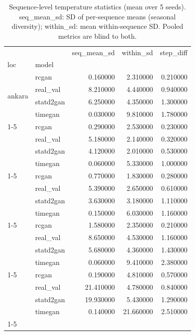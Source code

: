 \begin{table}
\caption{Sequence-level temperature statistics (mean over 5 seeds). seq\_mean\_sd: SD of per-sequence means (seasonal diversity); within\_sd: mean within-sequence SD. Pooled metrics are blind to both.}
\label{tab:seq_level}
\begin{tabular}{llrrr}
\toprule
 &  & seq\_mean\_sd & within\_sd & step\_diff \\
loc & model &  &  &  \\
\midrule
\multirow[t]{4}{*}{ankara} & rcgan & 0.160000 & 2.310000 & 0.210000 \\
 & real\_val & 8.210000 & 4.440000 & 0.940000 \\
 & statd2gan & 6.250000 & 4.350000 & 1.300000 \\
 & timegan & 0.030000 & 9.810000 & 1.780000 \\
\cline{1-5}
\multirow[t]{4}{*}{bergen} & rcgan & 0.290000 & 2.530000 & 0.230000 \\
 & real\_val & 5.180000 & 2.140000 & 0.320000 \\
 & statd2gan & 4.120000 & 2.010000 & 0.530000 \\
 & timegan & 0.060000 & 5.330000 & 1.000000 \\
\cline{1-5}
\multirow[t]{4}{*}{dubai} & rcgan & 0.770000 & 1.830000 & 0.280000 \\
 & real\_val & 5.390000 & 2.650000 & 0.610000 \\
 & statd2gan & 3.630000 & 3.180000 & 1.110000 \\
 & timegan & 0.150000 & 6.030000 & 1.160000 \\
\cline{1-5}
\multirow[t]{4}{*}{lhasa} & rcgan & 1.580000 & 2.350000 & 0.210000 \\
 & real\_val & 8.650000 & 4.530000 & 1.160000 \\
 & statd2gan & 5.680000 & 4.360000 & 1.430000 \\
 & timegan & 0.060000 & 9.410000 & 2.380000 \\
\cline{1-5}
\multirow[t]{4}{*}{yakutsk} & rcgan & 0.190000 & 4.810000 & 0.570000 \\
 & real\_val & 21.410000 & 4.780000 & 0.840000 \\
 & statd2gan & 19.930000 & 5.430000 & 1.290000 \\
 & timegan & 0.140000 & 21.660000 & 2.510000 \\
\cline{1-5}
\bottomrule
\end{tabular}
\end{table}
